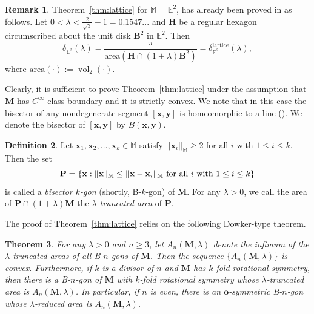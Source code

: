 \documentclass[11pt]{amsart}
\DeclareMathOperator{\vol}{vol}
\newcommand{\Eu}{\mathbb{E}}
\newcommand{\BB}{\mathbf{B}}
\newcommand{\M}{\mathbb{M}}
\newcommand{\MM}{\mathbf{M}}
\newcommand{\PP}{\mathbf{P}}
\newcommand{\y}{\mathbf{y}}
\newcommand{\x}{\mathbf{x}}
\renewcommand{\o}{\mathbf{o}}
\newtheorem{theorem}{Theorem}[section]
\theoremstyle{definition}
\newtheorem{definition}[theorem]{Definition}
\newtheorem{remark}[theorem]{Remark}
\numberwithin{equation}{section}
\begin{document}
 

\begin{remark}
Theorem~\ref{thm:lattice} for $\M=\Eu^2$, has already been proved in \cite{Be-La-2015} as follows. Let $0<\lambda<\frac{2}{\sqrt{3}}-1=0.1547...$ and $\mathbf{H}$ be a regular hexagon circumscribed about the unit disk $\BB^2$ in $\Eu^2$. Then
\begin{equation}\label{fourth}
{\delta}_{\Eu^2}(\lambda)=\frac{\pi}{\mathrm{area}\left(\mathbf{H}\cap(1+\lambda)\BB^2\right)}={\delta}_{\Eu^2}^{\mathrm{lattice}}(\lambda),
\end{equation}
where $\mathrm{area}(\cdot):=\vol_2(\cdot)$.
\end{remark}


Clearly, it is sufficient to prove Theorem~\ref{thm:lattice} under the assumption that $\MM$ has $C^{\infty}$-class boundary and it is strictly convex. We note that in this case the bisector of any nondegenerate segment $[\x, \y]$ is homeomorphic to a line (\cite{AKL}). We denote the bisector of $[\x,\y]$ by $B(\x,\y)$.

\begin{definition}
Let $\x_1,\x_2,\ldots, \x_k \in \M$ satisfy $||\x_i||_{\M} \geq 2$ for all $i$ with $1\leq i\leq k$. Then the set
\[
\PP = \{ \x : \|\x\|_{\M}  \leq \|\x-\x_i\|_{\M} \hbox{ for all } i \hbox{ with }1\leq i\leq k\} 
\]
is called a \emph{bisector $k$-gon} (shortly, B-$k$-gon) of $\MM$. For any $\lambda > 0$, we call the area of $\PP \cap (1+\lambda) \MM$ the \emph{$\lambda$-truncated area} of $\PP$.
\end{definition}

The proof of Theorem~\ref{thm:lattice} relies on the following Dowker-type theorem.

\begin{theorem}\label{thm:Dowker}
For any $\lambda > 0$ and $n \geq 3$, let $A_n(\MM,\lambda)$ denote the infimum of the $\lambda$-truncated areas of all B-$n$-gons of $\MM$. Then the sequence $\{ A_n(\MM,\lambda) \}$ is convex. Furthermore, if $k$ is a divisor of $n$ and $\MM$ has $k$-fold rotational symmetry, then there is a B-$n$-gon of $\MM$ with $k$-fold rotational symmetry whose $\lambda$-truncated area is $A_n(\MM,\lambda)$. In particular, if $n$ is even, there is an $\o$-symmetric B-$n$-gon whose $\lambda$-reduced area is $A_n(\MM,\lambda)$.
\end{theorem}
\end{document}
